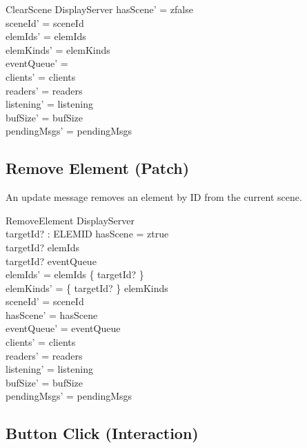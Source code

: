 \documentclass[a4paper,10pt,fleqn]{article}
\begin{document}
\begin{schema}{ClearScene}
  \Delta DisplayServer
  \where
  hasScene' = zfalse \\
  sceneId' = sceneId \\
  elemIds' = elemIds \\
  elemKinds' = elemKinds \\
  eventQueue' = \emptyset \\
  clients' = clients \\
  readers' = readers \\
  listening' = listening \\
  bufSize' = bufSize \\
  pendingMsgs' = pendingMsgs
\end{schema}

\subsection{Remove Element (Patch)}

An update message removes an element by ID from the current scene.

\begin{schema}{RemoveElement}
  \Delta DisplayServer \\
  targetId? : ELEMID
  \where
  hasScene = ztrue \\
  targetId? \in elemIds \\
  targetId? \notin eventQueue \\
  elemIds' = elemIds \setminus \{ targetId? \} \\
  elemKinds' = \{ targetId? \} \ndres elemKinds \\
  sceneId' = sceneId \\
  hasScene' = hasScene \\
  eventQueue' = eventQueue \\
  clients' = clients \\
  readers' = readers \\
  listening' = listening \\
  bufSize' = bufSize \\
  pendingMsgs' = pendingMsgs
\end{schema}

\subsection{Button Click (Interaction)}
\end{document}
